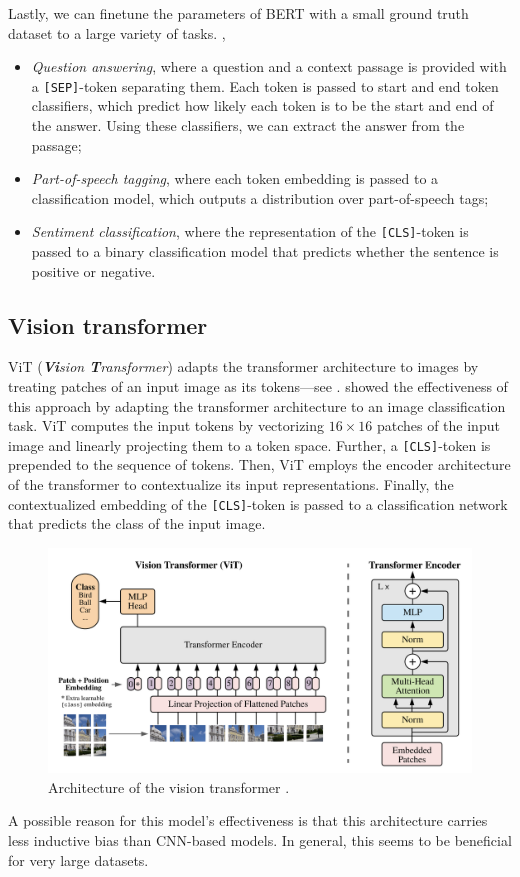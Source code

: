 Lastly, we can finetune the parameters of BERT with a small ground truth dataset to a large variety
of tasks. \Eg,
\begin{itemize}
    \item \textit{Question answering}, where a question and a context passage is provided with a \texttt{[SEP]}-token
          separating them. Each token is passed to start and end token classifiers, which predict how likely
          each token is to be the start and end of the answer. Using these classifiers, we can extract the
          answer from the passage;
    \item \textit{Part-of-speech tagging}, where each token embedding is passed to a classification model, which
          outputs a distribution over part-of-speech tags;
    \item \textit{Sentiment classification}, where the representation of the \texttt{[CLS]}-token is passed to a
          binary classification model that predicts whether the sentence is positive or negative.
\end{itemize}

\subsection{Vision transformer}

ViT (\textit{\textbf{Vi}sion \textbf{T}ransformer}) \citep{dosovitskiy2020image} adapts the
transformer architecture to images by treating patches of an input image as its tokens---see
. \citet{dosovitskiy2020image} showed the effectiveness of this approach by adapting
the transformer architecture to an image classification task. ViT computes the input tokens by
vectorizing $16 \times 16$ patches of the input image and linearly projecting them to a token
space. Further, a \texttt{[CLS]}-token is prepended to the sequence of tokens. Then, ViT employs
the encoder architecture of the transformer to contextualize its input representations. Finally,
the contextualized embedding of the \texttt{[CLS]}-token is passed to a classification network that
predicts the class of the input image.

\begin{figure}[t]
    \centering
    \includegraphics[width=\textwidth]{figures/vit}
    \caption{Architecture of the vision transformer \citep{dosovitskiy2020image}.}
    \label{fig:vit}
\end{figure}

A possible reason for this model's effectiveness is that this architecture carries less inductive
bias than CNN-based models. In general, this seems to be beneficial for very large datasets.
